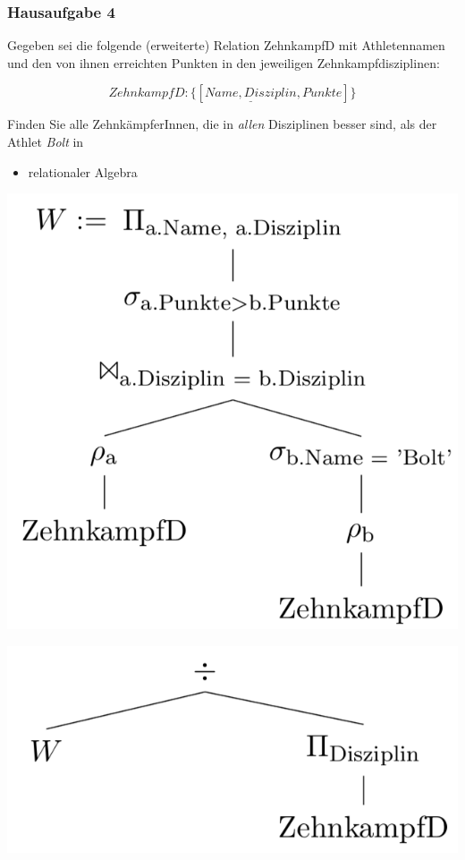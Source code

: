 \begin{frame}[fragile]
	\frametitle{Hausaufgabe 4}
	\vspace{0.25cm}

	\begin{multicols}{2}
		Gegeben sei die folgende (erweiterte) Relation ZehnkampfD mit 
		Athletennamen und den von ihnen erreichten Punkten in den jeweiligen Zehnkampfdisziplinen:

		\[ ZehnkampfD: \{[ \underline{Name, Disziplin}, Punkte ]\} \]

		Finden Sie alle ZehnkämpferInnen, die in \textit{allen} Disziplinen besser sind,
		als der Athlet \textit{Bolt} in
		\begin{itemize}
			\item relationaler Algebra
		\end{itemize}
		\vfill\columnbreak

		\begin{center}
			\includegraphics[height=.4\paperheight]{./4-a-1.png}
		\end{center}
		\pause 
		\begin{center}
			\includegraphics[height=.2\paperheight]{./4-a-2.png}
		\end{center}
	\end{multicols}
\end{frame}

